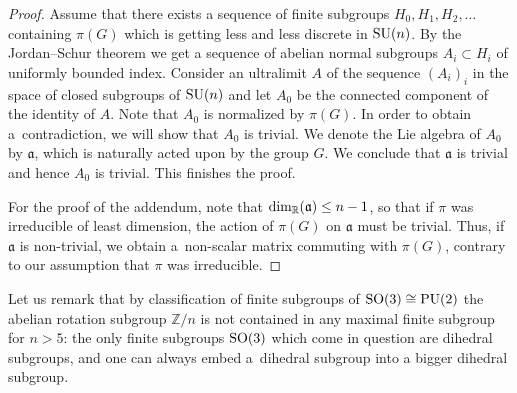 \documentclass[pdftex]{sigma}
\numberwithin{equation}{section}
\begin{document}
\begin{proof} Assume that there exists a sequence of finite subgroups $H_0, H_1, H_2, \dots$ containing $\pi(G)$ which is getting less and less discrete in ${\rm SU}(n)$. By the Jordan--Schur theorem we get a sequence of abelian normal subgroups $A_i \subset H_i$ of uniformly bounded index. Consider an ultralimit $A$ of the sequence $(A_i)_i$ in the space of closed subgroups of ${\rm SU}(n)$ and let $A_0$ be the connected component of the identity of $A$. Note that $A_0$ is normalized by $\pi(G)$. In order to obtain a~contradiction, we will show that $A_0$ is trivial.
We denote the Lie algebra of $A_0$ by $\mathfrak{a}$, which is naturally acted upon by the group $G$. We conclude that $\mathfrak{a}$ is trivial and hence $A_0$ is trivial. This finishes the proof.

For the proof of the addendum, note that ${\rm dim}_{\mathbb R} (\mathfrak{a}) \leq n-1$, so that if $\pi$ was irreducible of least dimension, the action of $\pi(G)$ on $\mathfrak{a}$ must be trivial. Thus, if $\mathfrak{a}$ is non-trivial, we obtain a~non-scalar matrix commuting with $\pi(G)$, contrary to our assumption that $\pi$ was irreducible.\vspace{-.5ex}
\end{proof}

Let us remark that by classification of finite subgroups of $\rm{SO}(3) \cong \rm{PU}(2)$ the abelian rotation subgroup $\mathbb Z/n$ is not contained in any maximal finite subgroup for $n > 5$: the only finite subgroups $\rm{SO}(3)$ which come in question are dihedral subgroups, and one can always embed a~dihedral subgroup into a bigger dihedral subgroup.\vspace{-1ex}
\end{document}
